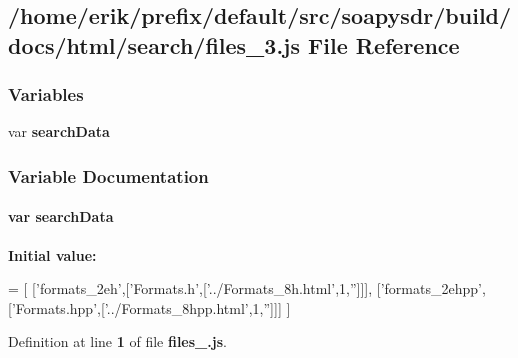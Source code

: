 \subsection{/home/erik/prefix/default/src/soapysdr/build/docs/html/search/files\+\_\+3.js File Reference}
\label{files__3_8js}
\subsubsection*{Variables}
\begin{DoxyCompactItemize}
\item 
var {\bf search\+Data}
\end{DoxyCompactItemize}


\subsubsection{Variable Documentation}
\paragraph[{search\+Data}]{\setlength{\rightskip}{0pt plus 5cm}var search\+Data}\label{files__3_8js_ad01a7523f103d6242ef9b0451861231e}
{\bfseries Initial value\+:}
\begin{DoxyCode}
=
[
  [\textcolor{stringliteral}{'formats\_2eh'},[\textcolor{stringliteral}{'Formats.h'},[\textcolor{stringliteral}{'../Formats\_8h.html'},1,\textcolor{stringliteral}{''}]]],
  [\textcolor{stringliteral}{'formats\_2ehpp'},[\textcolor{stringliteral}{'Formats.hpp'},[\textcolor{stringliteral}{'../Formats\_8hpp.html'},1,\textcolor{stringliteral}{''}]]]
]
\end{DoxyCode}


Definition at line {\bf 1} of file {\bf files\+\_.\+js}.

